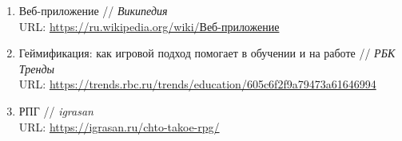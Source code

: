\documentclass[../document.tex]{subfiles}
\begin{document}
\begin{enumerate}
    \item  Веб-приложение // \textit{Википедия} \\URL: \href{https://ru.wikipedia.org/wiki/Веб-приложение}{https://ru.wikipedia.org/wiki/Веб-приложение}
    \item  Геймификация: как игровой подход помогает в обучении и на работе // \textit{РБК Тренды}  \\URL: \href{https://trends.rbc.ru/trends/education/605c6f2f9a79473a61646994}{https://trends.rbc.ru/trends/education/605c6f2f9a79473a61646994}
    \item   РПГ // \textit{igrasan}  \\URL: \href{https://igrasan.ru/chto-takoe-rpg/}{https://igrasan.ru/chto-takoe-rpg/}
\end{enumerate}
\end{document}
